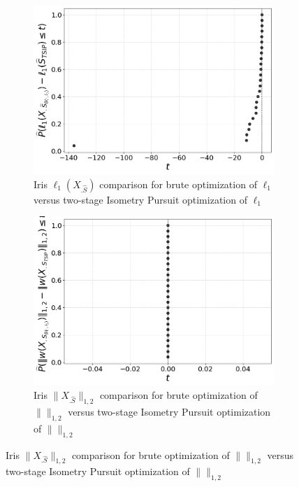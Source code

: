 \begin{figure}[t]
    \centering
    \begin{subfigure}[b]{0.45\textwidth}
        \centering
        \includegraphics[width=\textwidth]{../figures/iris_isometry_losses_iso_ecdf}
        \caption{Iris $\ell_1(X_{.\widehat S})$ comparison for brute optimization of $\ell_1$ versus two-stage Isometry Pursuit optimization of $\ell_1$}
        \label{fig:iris_isometry_losses_ecdf}
    \end{subfigure}
    \hfill
    \begin{subfigure}[b]{0.45\textwidth}
        \centering
        \includegraphics[width=\textwidth]{../figures/iris_isometry_losses_ts_ecdf}
        \caption{Iris $\|X_{.\widehat S}\|_{1,2}$ comparison for brute optimization of $\|\|_{1,2}$ versus two-stage Isometry Pursuit optimization of $\|\|_{1,2}$}
        \label{fig:iris_multitask_losses_ecdf}
    \end{subfigure}


\end{figure}
